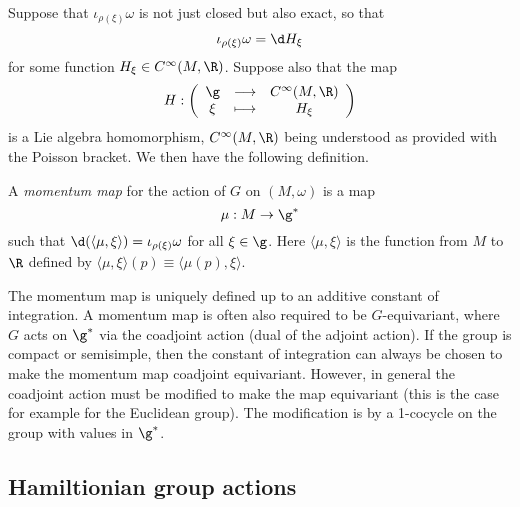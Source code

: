 \documentclass{worksheetclass}
\begin{document}
        Suppose that $\iota_{\rho(\xi)}\omega$ is not just closed but also exact, so that
        \begin{equation}
            \iota_{\rho(\xi)}\omega= \d H_{\xi}
        \end{equation}
        for some function $H_{\xi}\in C^\infty(M,\R)$. Suppose also that the map
        \begin{equation}
            H:\left(
            \begin{array}{ccc}
                    \g & \longrightarrow & C^\infty(M,\R) \\
                    \xi & \longmapsto & H_\xi
            \end{array}
            \right)
        \end{equation}
        is a Lie algebra homomorphism, $C^\infty(M,\R)$ being understood as provided with the Poisson bracket. We then have the following definition.
        \begin{defn}
            A \emph{momentum map} for the action of $G$ on $(M,\omega)$ is a map
            \begin{equation}
                \mu:M\to\g^*
            \end{equation}
            such that $\d(\langle \mu,\xi\rangle)=\iota_{\rho(\xi)}\omega$ for all $\xi\in\g$. Here $\langle \mu,\xi\rangle$ is the function from $M$ to $\R$ defined by $\langle \mu,\xi\rangle(p)\equiv\langle \mu(p),\xi\rangle$.
        \end{defn}
        The momentum map is uniquely defined up to an additive constant of integration. A momentum map is often also required to be $G$-equivariant, where $G$ acts on $\g^*$ via the coadjoint action (dual of the adjoint action). If the group is compact or semisimple, then the constant of integration can always be chosen to make the momentum map coadjoint equivariant. However, in general the coadjoint action must be modified to make the map equivariant (this is the case for example for the Euclidean group). The modification is by a 1-cocycle on the group with values in $\g^*$.

    \subsection{Hamiltionian group actions}
\end{document}
